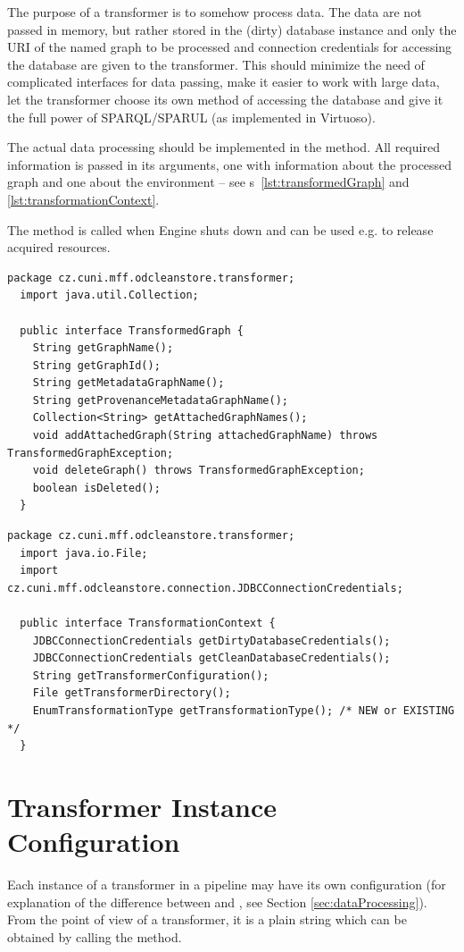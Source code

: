 The purpose of a transformer is to somehow process data. The data are not passed in memory, but rather stored in the (dirty) database instance and only the URI of the named graph to be processed and connection credentials for accessing the database are given to the transformer. This should minimize the need of complicated interfaces for data passing, make it easier to work with large data, let the transformer choose its own method of accessing the database and give it the full power of SPARQL/SPARUL (as implemented in Virtuoso).

The actual data processing should be implemented in the  method. All required information is passed in its arguments, one with information about the processed graph and one about the environment -- see \lstlistingname{}s~\ref{lst:transformedGraph} and \ref{lst:transformationContext}.

The  method is called when Engine shuts down and can be used e.g. to release acquired resources.

\begin{lstlisting}[caption={TransformedGraph interface},label=lst:transformedGraph]
  package cz.cuni.mff.odcleanstore.transformer;
  import java.util.Collection;

  public interface TransformedGraph {
    String getGraphName();
    String getGraphId();
    String getMetadataGraphName();
    String getProvenanceMetadataGraphName();
    Collection<String> getAttachedGraphNames();
    void addAttachedGraph(String attachedGraphName) throws TransformedGraphException;
    void deleteGraph() throws TransformedGraphException;
    boolean isDeleted();
  }
\end{lstlisting}

\begin{lstlisting}[caption={TransformationContext interface},label=lst:transformationContext]
  package cz.cuni.mff.odcleanstore.transformer;
  import java.io.File;
  import cz.cuni.mff.odcleanstore.connection.JDBCConnectionCredentials;

  public interface TransformationContext {
    JDBCConnectionCredentials getDirtyDatabaseCredentials();
    JDBCConnectionCredentials getCleanDatabaseCredentials();
    String getTransformerConfiguration();
    File getTransformerDirectory();
    EnumTransformationType getTransformationType(); /* NEW or EXISTING */
  }
\end{lstlisting}

\section{Transformer Instance Configuration}
\label{sec:transformerInstConfig}
Each instance of a transformer in a pipeline may have its own configuration (for explanation of the difference between  and , see Section \ref{sec:dataProcessing}). From the point of view of a transformer, it is a plain string which can be obtained by calling the  method.

